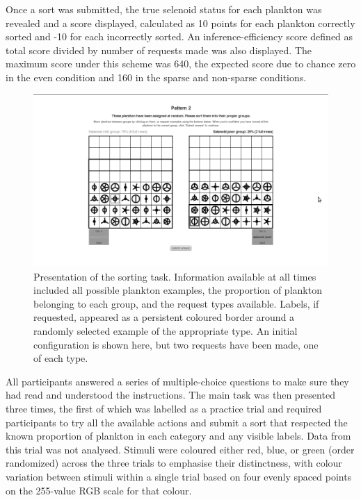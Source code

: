 \documentclass[10pt,letterpaper]{article}
\begin{document}
 Once a sort was submitted, the true selenoid status for each plankton was revealed and a score displayed, calculated as 10 points for each plankton correctly sorted and -10 for each incorrectly sorted. An inference-efficiency score defined as total score divided by number of requests made was also displayed. The maximum score under this scheme was 640, the expected score due to chance zero in the {\sc even} condition and 160 in the {\sc sparse} and {\sc non-sparse} conditions. 

\begin{figure}[t] %
\includegraphics[width=\textwidth]{screenshot_bw.png}
\caption{Presentation of the sorting task. Information available at all times included all possible plankton examples, the proportion of plankton belonging to each group, and the request types available. Labels, if requested, appeared as a persistent coloured border around a randomly selected example of the appropriate type. An initial configuration is shown here, but two requests have been made, one of each type.}
\label{screenshot}
\end{figure}

All participants answered a series of multiple-choice questions to make sure they had read and understood the instructions. The main task was then presented three times, the first of which was labelled as a practice trial and required participants to try all the available actions and submit a sort that respected the known proportion of plankton in each category and any visible labels. Data from this trial was not analysed. Stimuli were coloured either red, blue, or green (order randomized) across the three trials to emphasise their distinctness, with colour variation between stimuli within a single trial based on four evenly spaced points on the 255-value RGB scale for that colour.
\end{document}

